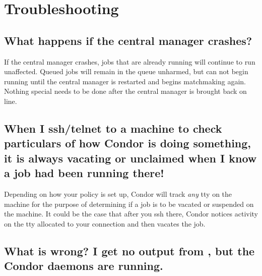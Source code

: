 \section{Troubleshooting}

\subsection*{What happens if the central manager crashes?}

If the central manager crashes, jobs that are already running will
continue to run unaffected.
Queued jobs will remain in the queue unharmed, but can not begin
running until the central manager is restarted and begins matchmaking
again.
Nothing special needs to be done after the central manager is brought
back on line.

\subsection*{When I ssh/telnet to a machine to check particulars of how
Condor is doing something, it is always vacating or unclaimed when I
know a job had been running there!}

Depending on how your policy is set up, Condor will track \emph{any} tty
on the machine for the purpose of determining if a job is to be vacated
or suspended on the machine. It could be the case that after you ssh
there, Condor notices activity on the tty allocated to your connection
and then vacates the job.

\subsection*{What is wrong? I get no output from , but the Condor daemons are running.}

